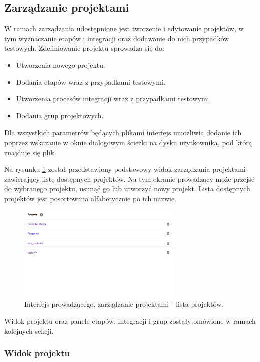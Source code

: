 \subsection{Zarządzanie projektami}
\label{lecturer-management}

W ramach zarządzania udostępnione jest tworzenie i edytowanie projektów, w tym wyznaczanie etapów i integracji oraz dodawanie do nich przypadków testowych.
Zdefiniowanie projektu sprowadza się do:
\begin {itemize}
    \item Utworzenia nowego projektu.
    \item Dodania etapów wraz z przypadkami testowymi.
    \item Utworzenia procesów integracji wraz z przypadkami testowymi.
    \item Dodania grup projektowych.
\end {itemize}

Dla wszystkich parametrów będących plikami interfejs umożliwia dodanie ich poprzez wskazanie w oknie dialogowym ścieżki na dysku użytkownika, pod którą znajduje się plik.

Na rysunku \ref{fig:lecturer_projects_list} został przedstawiony podstawowy widok zarządzania projektami zawierający listę dostępnych projektów.
Na tym ekranie prowadzący może przejść do wybranego projektu, usunąć go lub utworzyć nowy projekt.
Lista dostępnych projektów jest posortowana alfabetycznie po ich nazwie.

\begin{figure}[h]
    \centering
    \includegraphics[width = 8cm]{chapter04/lecturer_projects_list.png}
    \caption{Interfejs prowadzącego, zarządzanie projektami - lista projektów.}
    \label{fig:lecturer_projects_list}
\end{figure}

Widok projektu oraz panele etapów, integracji i grup zostały omówione w ramach kolejnych sekcji.

\subsubsection{Widok projektu}

